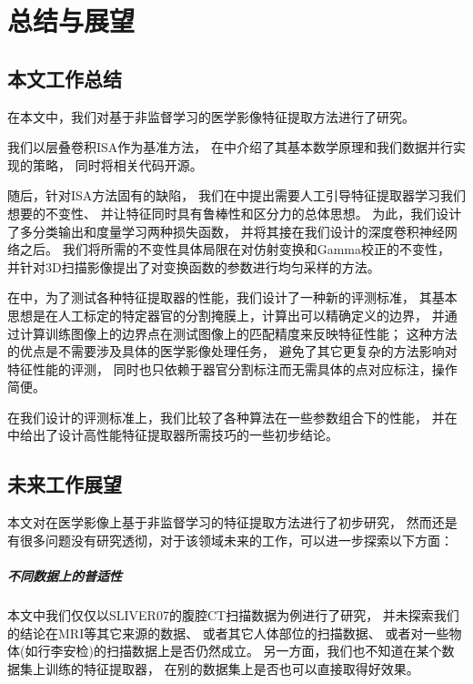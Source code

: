 
\chapter{总结与展望\label{chap:discuss}}

\section{本文工作总结}
在本文中，我们对基于非监督学习的医学影像特征提取方法进行了研究。

我们以层叠卷积ISA作为基准方法，
在中介绍了其基本数学原理和我们数据并行实现的策略，
同时将相关代码开源。

随后，针对ISA方法固有的缺陷，
我们在中提出需要人工引导特征提取器学习我们想要的不变性、
并让特征同时具有鲁棒性和区分力的总体思想。
为此，我们设计了多分类输出和度量学习两种损失函数，
并将其接在我们设计的深度卷积神经网络之后。
我们将所需的不变性具体局限在对仿射变换和Gamma校正的不变性，
并针对3D扫描影像提出了对变换函数的参数进行均匀采样的方法。

在中，为了测试各种特征提取器的性能，我们设计了一种新的评测标准，
其基本思想是在人工标定的特定器官的分割掩膜上，计算出可以精确定义的边界，
并通过计算训练图像上的边界点在测试图像上的匹配精度来反映特征性能；
这种方法的优点是不需要涉及具体的医学影像处理任务，
避免了其它更复杂的方法影响对特征性能的评测，
同时也只依赖于器官分割标注而无需具体的点对应标注，操作简便。

在我们设计的评测标准上，我们比较了各种算法在一些参数组合下的性能，
并在中给出了设计高性能特征提取器所需技巧的一些初步结论。

\section{未来工作展望}
本文对在医学影像上基于非监督学习的特征提取方法进行了初步研究，
然而还是有很多问题没有研究透彻，对于该领域未来的工作，可以进一步探索以下方面：

\paragraph{不同数据上的普适性}
本文中我们仅仅以SLIVER07的腹腔CT扫描数据为例进行了研究，
并未探索我们的结论在MRI等其它来源的数据、
或者其它人体部位的扫描数据、
或者对一些物体(如行李安检)的扫描数据上是否仍然成立。
另一方面，我们也不知道在某个数据集上训练的特征提取器，
在别的数据集上是否也可以直接取得好效果。

